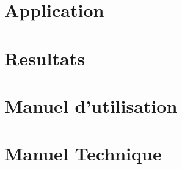 \documentclass{article}
\begin{document}
	\newpage
	

	\newpage
	

	\newpage
	

	\section{Application}

	\section{Resultats}

	\section{Manuel d'utilisation}

	\section{Manuel Technique}


	\printbibliography
\end{document}
